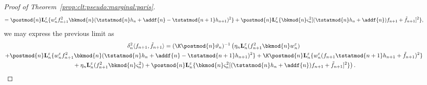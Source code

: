 \begin{proof}[Proof of Theorem~\ref{prop:clt:pseudo:marginal:paris}]
\begin{multline*}
= \postmod{n} \ukmod{n} \{ \wgtfuncmod{n} f_{n + 1}^2 \bkmod{n} (\tstatmod{n} h_n + \addf{n} - \tstatmod{n + 1} h_{n + 1})^2 \} + \postmod{n} \ukmod{n} \{ \bkmod{n} \ukestvar{n} [(\tstatmod{n} h_n + \addf{n}) f_{n + 1} + \ftd{n + 1}]^2 \}, 
\end{multline*}
we may express the previous limit as 
\begin{multline*}
\incrementalvar_n^2 \langle f_{n + 1}, \ftd{n + 1} \rangle =  (\K \postmod{n} \adjfuncforward{n})^{-1} \left( \vphantom{\postmod{n} \ukmod{n} \{ \wgtfuncmod{n} f_{n + 1}^2 \bkmod{\postmod{n}} (\tstatmod{n} h_n + \addf{n} - \tstatmod{n + 1} h_{n + 1})^2 \} + \K \postmod{n} \ukmod{n} \{\wgtfuncmod{n}(f_{n + 1} \tstat{n + 1} h_{n + 1} + \ftd{n + 1})^2} \eta_n \ukmod{n}(f^2_{n + 1} \bkmod{n} \wgtfuncmod{n}) \right. \\
\left. + \postmod{n} \ukmod{n} \{ \wgtfuncmod{n} f_{n + 1}^2 \bkmod{n} (\tstatmod{n} h_n + \addf{n} - \tstatmod{n + 1} h_{n + 1})^2 \} + \K \postmod{n} \ukmod{n} \{ \wgtfuncmod{n}(f_{n + 1} \tstatmod{n + 1} h_{n + 1} + \ftd{n + 1})^2 \} \right. \\
\left. \vphantom{\post{n} \uk{n} \{ \wgtfunc{n} f_{n + 1}^2 \bkw{\post{n}} (\tstat{n} h_n + \addf{n} - \tstat{n + 1} h_{n + 1})^2 \} + \K \post{n} \uk{n} \{\wgtfunc{n}(f_{n + 1} \tstat{n + 1} h_{n + 1} + \ftd{n + 1})^2}
+ \eta_n \ukmod{n}(f^2_{n + 1} \bkmod{n} \ukestvar{n}) + \postmod{n} \ukmod{n} \{ \bkmod{n} \ukestvar{n} [(\tstatmod{n} h_n + \addf{n}) f_{n + 1} + \ftd{n + 1}]^2 \}
\right).  
\end{multline*}


\end{proof}
